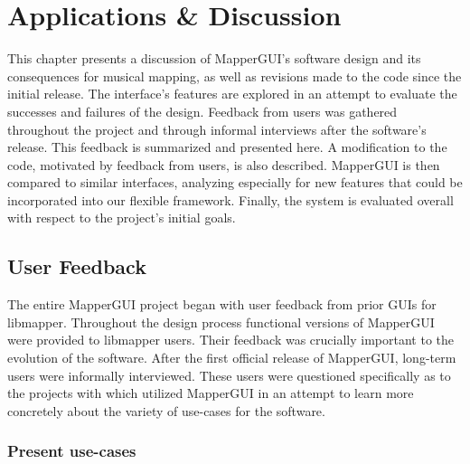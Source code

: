 \chapter{Applications \& Discussion}

This chapter presents a discussion of MapperGUI's software design and its consequences for musical mapping, as well as revisions made to the code since the initial release. The interface's features are explored in an attempt to evaluate the successes and failures of the design. Feedback from users was gathered throughout the project and through informal interviews after the software's release. This feedback is summarized and presented here. A modification to the code, motivated by feedback from users, is also described. MapperGUI is then compared to similar interfaces, analyzing especially for new features that could be incorporated into our flexible framework. Finally, the system is evaluated overall with respect to the project's initial goals.


\section{User Feedback} %
\label{sec:user_feedback}

The entire MapperGUI project began with user feedback from prior GUIs for libmapper. Throughout the design process functional versions of MapperGUI were provided to libmapper users. Their feedback was crucially important to the evolution of the software. After the first official release of MapperGUI, long-term users were informally interviewed. These users were questioned specifically as to the projects with which utilized MapperGUI in an attempt to learn more concretely about the variety of use-cases for the software.

	\subsection{Present use-cases} %
	\label{sub:present_use_cases}

